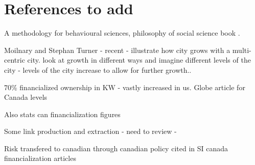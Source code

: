 
\section{References to add}
A methodology for behavioural sciences, philosophy of social science book \cite{kaplanConductInquiryMethodology2017}.


Moilnary and Stephan Turner - recent - illustrate how city grows with a multi-centric city. look at growth in different ways and imagine different levels of the city - levels of the city increase to allow for further growth..

70\% financialized ownership in KW - vastly increased in us. Globe article for Canada levels

Also stats can financialization figures

Some link production and extraction - need to review -


Risk transfered to canadian through canadian policy cited in SI canada financialization articles










